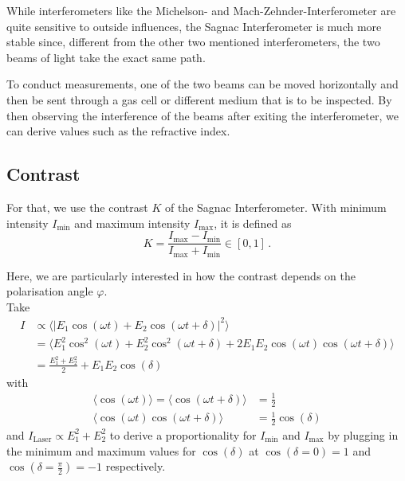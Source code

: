 While interferometers like the Michelson- and Mach-Zehnder-Interferometer are quite sensitive to outside influences, the Sagnac Interferometer is much more stable
since, different from the other two mentioned interferometers, the two beams of light take the exact same path.

To conduct measurements, one of the two beams can be moved horizontally and then be sent through a gas cell or different medium that is to be inspected.
By then observing the interference of the beams after exiting the interferometer, we can derive values such as the refractive index.


\subsection{Contrast}

For that, we use the contrast $K$ of the Sagnac Interferometer.
With minimum intensity $I_{\text{min}}$ and maximum intensity $I_\text{max}$, it is defined as 
\begin{equation}
    K = \frac{I_\text{max} - I_\text{min}}{I_\text{max} + I_\text{min}} \in [0, 1] \,.
    \label{eq:contrast}
\end{equation}

Here, we are particularly interested in how the contrast depends on the polarisation angle $\varphi$. \\

Take
\begin{align*}
    I &\propto \langle | E_1 \cos(\omega t) + E_2 \cos(\omega t + \delta) |^2 \rangle \\
      &= \langle E^2_1 \cos^2(\omega t) + E^2_2 \cos^2(\omega t + \delta) + 2 E_1 E_2 \cos(\omega t) \cos(\omega t + \delta) \rangle \\
      &= \frac{E^2_1 + E^2_2}{2} + E_1E_2 \cos(\delta)
\end{align*}
with 
\begin{align*}
    \langle \cos(\omega t) \rangle = \langle \cos(\omega t + \delta) \rangle &= \frac{1}{2} \\
    \langle \cos(\omega t) \cos(\omega t +\delta) \rangle &= \frac{1}{2} \cos(\delta)
\end{align*}
and $I_\text{Laser} \propto E^2_1 + E^2_2$ to derive a proportionality for $I_\text{min}$ and $I_\text{max}$
by plugging in the minimum and maximum values for $\cos(\delta)$ at $\cos(\delta=0) = 1$ and $\cos(\delta=\frac{\pi}{2}) = -1$ respectively. \\

